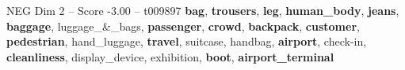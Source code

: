 \begin{textsample}{NEG Dim 2 – Score -3.00 – t009897}  \label{ex:f2_neg_025}
\textbf{bag}, \textbf{trousers}, \textbf{leg}, \textbf{human\_body}, \textbf{jeans}, \textbf{baggage}, luggage\_\&\_bags, \textbf{passenger}, \textbf{crowd}, \textbf{backpack}, \textbf{customer}, \textbf{pedestrian}, hand\_luggage, \textbf{travel}, suitcase, handbag, \textbf{airport}, check-in, \textbf{cleanliness}, display\_device, exhibition, \textbf{boot}, \textbf{airport\_terminal}

\end{textsample}
